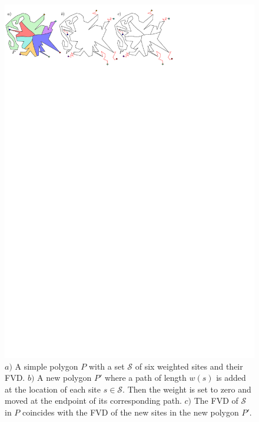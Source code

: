 \documentclass[a4paper, 11pt]{article}
\newcommand{\s}{\mathcal S}
\begin{document}
\begin{figure}[t]
\centering
\includegraphics{imgIntroVoronoi.pdf}
\caption{$a)$ A simple polygon $P$ with a set $\s$ of six weighted sites and their FVD. $b)$ A new polygon $P'$ where a path of length $w(s)$ is added at the location of each site $s\in \s$. Then the weight is set to zero and moved at the endpoint of its corresponding path.
$c)$ The FVD of $\s$ in $P$ coincides with the FVD of the new sites in the new polygon $P'$.}
\label{fig:WeightsNotHarder}
\end{figure}
\end{document}
